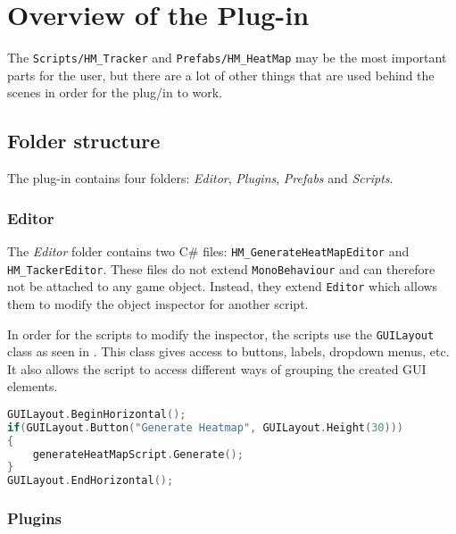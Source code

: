 \section{Overview of the Plug-in}
\label{Overview}

The \texttt{Scripts/HM\_Tracker} and \texttt{Prefabs/HM\_HeatMap} may be the most important parts for the user, but there are a lot of other things that are used behind the scenes in order for the plug/in to work.

\subsection{Folder structure}
\label{Overview_Folder}

The plug-in contains four folders: \textit{Editor}, \textit{Plugins}, \textit{Prefabs} and \textit{Scripts}.

\subsubsection*{Editor}
\label{Overview_Folder_Editor}

The \textit{Editor} folder contains two C\# files: \texttt{HM\_GenerateHeatMapEditor} and \texttt{HM\_TackerEditor}. These files do not extend \texttt{MonoBehaviour} and can therefore not be attached to any game object. Instead, they extend \texttt{Editor} which allows them to modify the object inspector for another script. 

In order for the scripts to modify the inspector, the scripts use the \texttt{GUILayout} class as seen in . This class gives access to buttons, labels, dropdown menus, etc. It also allows the script to access different ways of grouping the created GUI elements.\\

\begin{lstlisting}[language=C]
GUILayout.BeginHorizontal();
if(GUILayout.Button("Generate Heatmap", GUILayout.Height(30)))
{
	generateHeatMapScript.Generate();
}
GUILayout.EndHorizontal();
\end{lstlisting}

\subsubsection*{Plugins}
\label{Overview_Folder_Plugins}

